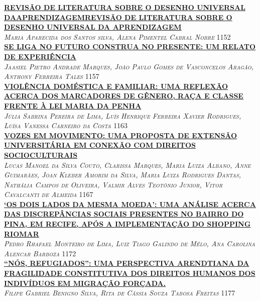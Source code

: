 \noindent \textsc{\hyperlink{trabalhos/251371.pdf.1}{\textbf{REVISÃO DE LITERATURA SOBRE O DESENHO UNIVERSAL DAAPRENDIZAGEMREVISÃO DE LITERATURA SOBRE O DESENHO UNIVERSAL DA APRENDIZAGEM}}}\\ 
\noindent \textsc{\textit{Maria Aparecida dos Santos silva, Alena Pimentel Cabral Nobre}} \hfill 1152\\ 

\noindent \textsc{\hyperlink{trabalhos/249968.pdf.1}{\textbf{SE LIGA NO FUTURO CONSTRUA NO PRESENTE: UM RELATO DE EXPERIÊNCIA }}}\\ 
\noindent \textsc{\textit{Jaasiel Pietro Andrade Marques, João Paulo Gomes de Vasconcelos Aragão, Anthony Ferreira Tales}} \hfill 1157\\ 

\noindent \textsc{\hyperlink{trabalhos/250296.pdf.1}{\textbf{VIOLÊNCIA DOMÉSTICA E FAMILIAR: UMA REFLEXÃO ACERCA DOS MARCADORES DE GÊNERO, RAÇA E CLASSE FRENTE À LEI MARIA DA PENHA}}}\\ 
\noindent \textsc{\textit{Júlia Sabrina Pereira de Lima, Luís Henrique Ferreira Xavier Rodrigues, Luísa Vanessa Carneiro da Costa}} \hfill 1163\\ 

\noindent \textsc{\hyperlink{trabalhos/249706.pdf.1}{\textbf{VOZES EM MOVIMENTO: UMA PROPOSTA DE EXTENSÃO UNIVERSITÁRIA EM CONEXÃO COM DIREITOS SOCIOCULTURAIS}}}\\ 
\noindent \textsc{\textit{Lucas Manoel da Silva Couto, Clarissa Marques, Maria Luiza Albano, Anne Guimarães, Joan Kleber Amorim da Silva, Maria Luiza Rodrigues Dantas, Nathália Campos de Oliveira, Valmir Alves Teotônio Junior, Vitor Cavalcanti de Almeida}} \hfill 1167\\ 

\noindent \textsc{\hyperlink{trabalhos/250138.pdf.1}{\textbf{‘OS DOIS LADOS DA MESMA MOEDA’: UMA ANÁLISE ACERCA DAS DISCREPÂNCIAS SOCIAIS PRESENTES NO BAIRRO DO PINA, EM RECIFE, APÓS A IMPLEMENTAÇÃO DO SHOPPING RIOMAR}}}\\ 
\noindent \textsc{\textit{Pedro Rhafael Monteiro de Lima, Luiz Tiago Galindo de Mélo, Ana Carolina Alencar Barboza}} \hfill 1172\\ 

\noindent \textsc{\hyperlink{trabalhos/250392.pdf.1}{\textbf{“NÓS, REFUGIADOS”: UMA PERSPECTIVA ARENDTIANA DA FRAGILIDADE CONSTITUTIVA DOS DIREITOS HUMANOS DOS INDIVÍDUOS EM MIGRAÇÃO FORÇADA.}}}\\ 
\noindent \textsc{\textit{Filipe Gabriel Benigno Silva, Rita de Cássia Souza Tabosa Freitas}} \hfill 1177\\ 


